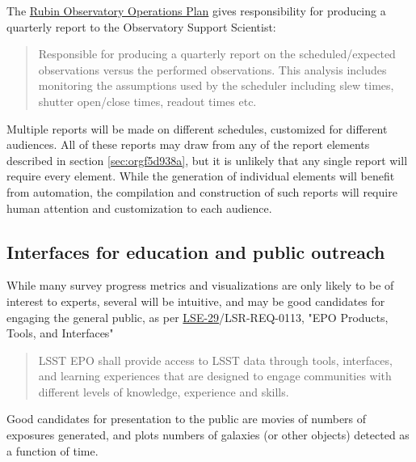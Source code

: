 The \href{https://docushare.lsst.org/docushare/dsweb/Get/Document-36797/Rubin\%20Observatory\%20Operations\%20Plan\%20April\%202020.pdf}{Rubin Observatory Operations Plan} gives responsibility for producing a quarterly report to the Observatory Support Scientist:
\begin{quote}
Responsible for producing a quarterly report on the scheduled/expected observations versus the performed observations. This analysis includes monitoring the assumptions used by the scheduler including slew times, shutter open/close times, readout times etc. 
\end{quote}

Multiple reports will be made on different schedules, customized for different audiences.
All of these reports may draw from any of the report elements described in section \ref{sec:orgf5d938a}, but it is unlikely that any single report will require every element.
While the generation of individual elements will benefit from automation, the compilation and construction of such reports will require human attention and customization to each audience.

\subsection{Interfaces for education and public outreach}
\label{sec:org2b4d764}
While many survey progress metrics and visualizations are only likely to be of interest to experts, several will be intuitive, and may be good candidates for engaging the general public, as per \href{https://ls.st/lse-29}{LSE-29}/LSR-REQ-0113, "EPO Products, Tools, and Interfaces"
\begin{quote}
LSST EPO shall provide access to LSST data through tools, interfaces,
and learning experiences that are designed to engage communities with
different levels of knowledge, experience and skills.
\end{quote}
Good candidates for presentation to the public are movies of numbers of exposures generated, and plots numbers of galaxies (or other objects) detected as a function of time.
